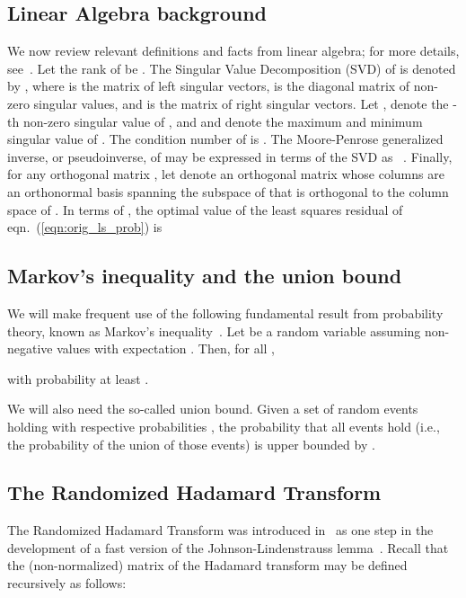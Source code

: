 \documentclass[11pt]{article}
\begin{document}
\subsection{Linear Algebra background}

We now review relevant definitions and facts from linear algebra; for more details, see~\cite{Stewart90,GVL96,Bhatia97,BIG03}. Let the rank of  be . The Singular Value Decomposition (SVD) of  is denoted by , where  is the matrix of left singular vectors,  is the diagonal matrix of non-zero singular values, and  is the matrix of right singular vectors. Let , denote the -th non-zero singular value of , and  and  denote the maximum and minimum singular value of . The condition number of  is . The Moore-Penrose generalized inverse, or pseudoinverse, of  may be expressed in terms of the SVD as ~\cite{BIG03}. Finally, for any orthogonal matrix , let  denote an orthogonal matrix whose columns are an orthonormal basis spanning the subspace of  that is orthogonal to the column space of .  In terms of , the optimal value of the least squares residual of eqn.~(\ref{eqn:orig_ls_prob}) is

\subsection{Markov's inequality and the union bound}

We will make frequent use of the following fundamental result from probability theory, known as Markov's inequality~\cite{MotwaniRaghavan95}. Let  be a random variable assuming non-negative values with expectation . Then, for all ,

with probability at least .

We will also need the so-called union bound. Given a set of random events  holding with respective probabilities , the probability that all events hold (i.e., the probability of the union of those events) is upper bounded by .

\subsection{The Randomized Hadamard Transform}\label{sxn:RHT}

The Randomized Hadamard Transform was introduced in~\cite{AC06} as one step in the development of a fast version of the Johnson-Lindenstrauss lemma~\cite{AC06,Matousek08_RSA}. Recall that the (non-normalized)  matrix of the Hadamard transform  may be defined recursively as follows:
\end{document}
